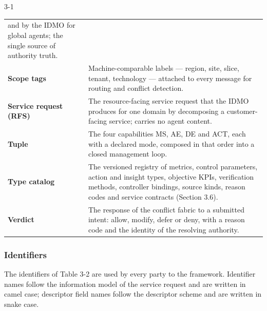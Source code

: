 \begin{wptable}{3-1}
\begin{longtable}[]{@{}
  >{\raggedright\arraybackslash}p{}
  >{\raggedright\arraybackslash}p{}@{}}
and by the IDMO for global agents; the single source of authority
truth. \\
\textbf{Scope tags} & Machine-comparable labels --- region, site, slice,
tenant, technology --- attached to every message for routing and
conflict detection. \\
\textbf{Service request (RFS)} & The resource-facing service request
that the IDMO produces for one domain by decomposing a customer-facing
service; carries no agent content. \\
\textbf{Tuple} & The four capabilities MS, AE, DE and ACT, each with a
declared mode, composed in that order into a closed management loop. \\
\textbf{Type catalog} & The versioned registry of metrics, control
parameters, action and insight types, objective KPIs, verification
methods, controller bindings, source kinds, reason codes and service
contracts (Section 3.6). \\
\textbf{Verdict} & The response of the conflict fabric to a submitted
intent: allow, modify, defer or deny, with a reason code and the
identity of the resolving authority. \\
\end{longtable}

\end{wptable}

\hypertarget{identifiers}{%
\subsubsection{Identifiers}\label{identifiers}}

The identifiers of Table 3-2 are used by every party to the framework.
Identifier names follow the information model of the service request and
are written in camel case; descriptor field names follow the descriptor
scheme and are written in snake case.

